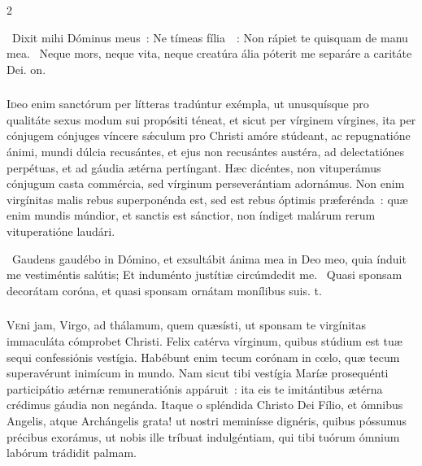 \documentclass[9pt,twoside]{extarticle}
\begin{document}
\begin{multicols}{2}
{{\begin{tightlist}{}
\item {}~Dixit mihi Dóminus meus~: Ne tímeas fília~~: \textred{*} Non rápiet te quisquam de manu mea. ~Neque mors, neque vita, neque creatúra ália póterit me separáre a caritáte Dei. on.
\end{tightlist}

\subsubsection*{\center {}}
\lettrine{I}deo enim sanctórum per lítteras tradúntur exémpla, ut unusquísque pro qualitáte sexus modum sui propósiti téneat, et sicut per vírginem vírgines, ita per cónjugem cónjuges víncere sǽculum pro Christi amóre stúdeant, ac repugnatióne ánimi, mundi dúlcia recusántes, et ejus non recusántes austéra, ad delectatiónes perpétuas, et ad gáudia ætérna pertíngant. Hæc dicéntes, non vituperámus cónjugum casta commércia, sed vírginum perseverántiam adornámus. Non enim virgínitas malis rebus superponénda est, sed est rebus óptimis præferénda~: quæ enim mundis múndior, et sanctis est sánctior, non índiget malárum rerum vituperatióne laudári.

\begin{tightlist}{}
\item {}~Gaudens gaudébo in Dómino, et exsultábit ánima mea in Deo meo, quia índuit me vestiméntis salútis; \textred{*} Et induménto justítiæ circúmdedit me. ~Quasi sponsam decorátam coróna, et quasi sponsam ornátam monílibus suis. t.
\end{tightlist}

\subsubsection*{\center {}}
\lettrine{V}eni jam, Virgo, ad thálamum, quem quæsísti, ut sponsam te virgínitas immaculáta cómprobet Christi. Felix catérva vírginum, quibus stúdium est tuæ sequi confessiónis vestígia. Habébunt enim tecum corónam in cœlo, quæ tecum superavérunt inimícum in mundo. Nam sicut tibi vestígia Maríæ prosequénti participátio ætérnæ remuneratiónis appáruit~: ita eis te imitántibus ætérna crédimus gáudia non negánda. Itaque o spléndida Christo Dei Fílio, et ómnibus Angelis, atque Archángelis grata! ut nostri meminísse dignéris, quibus póssumus précibus exorámus, ut nobis ille tríbuat indulgéntiam, qui tibi tuórum ómnium labórum trádidit palmam.

}}
\end{multicols}
\end{document}
